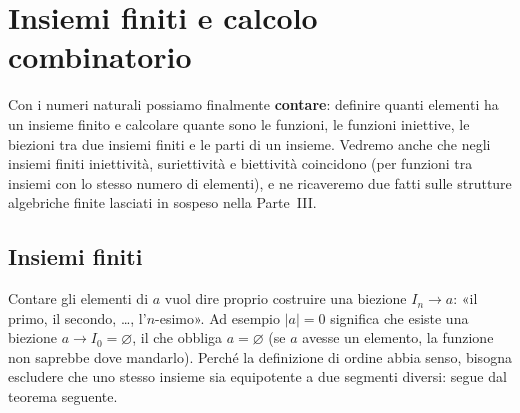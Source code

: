 \chapter{Insiemi finiti e calcolo combinatorio}\label{cap:finiti}

Con i numeri naturali possiamo finalmente \textbf{contare}: definire quanti elementi ha un insieme finito e calcolare quante
sono le funzioni, le funzioni iniettive, le biezioni tra due insiemi finiti e le parti di un insieme. Vedremo anche che negli
insiemi finiti iniettività, suriettività e biettività coincidono (per funzioni tra insiemi con lo stesso numero di elementi), e
ne ricaveremo due fatti sulle strutture algebriche finite lasciati in sospeso nella Parte~III.

\section{Insiemi finiti}\label{sec:finiti}


Contare gli elementi di $a$ vuol dire proprio costruire una biezione $I_n \to a$: «il primo, il secondo, \dots, l'$n$-esimo».
Ad esempio $|a| = 0$ significa che esiste una biezione $a \to I_0 = \varnothing$, il che obbliga $a = \varnothing$ (se $a$ avesse un
elemento, la funzione non saprebbe dove mandarlo). Perché la definizione di ordine abbia senso, bisogna escludere che uno stesso
insieme sia equipotente a due segmenti diversi: segue dal teorema seguente.

